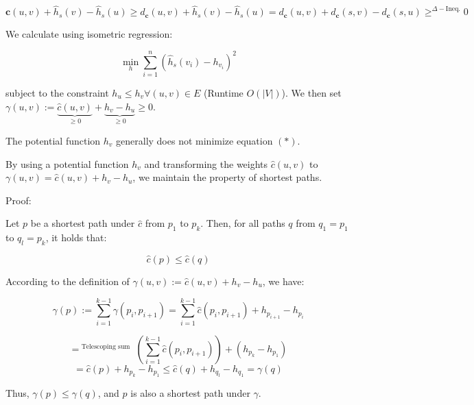 \documentclass[11pt]{scrartcl}
\begin{document}
$$\mathbf{c}(u,v)+\hat{h}_s(v)-\hat{h}_s(u) \ge d_{\mathbf{c}}(u,v) + \hat{h}_s(v)-\hat{h}_s(u) = d_{\mathbf{c}}(u,v)+d_{\mathbf{c}}(s,v)-d_{\mathbf{c}}(s,u) \ge^{\Delta-\text{Ineq.}} 0$$

We calculate using isometric regression:

$$\min_{h} \sum_{i=1}^n(\hat{h}_s(v_i)-h_{v_i})^2$$

subject to the constraint $h_u \le h_v \forall (u,v) \in E$ (Runtime $O(|V|)$).
We then set $\gamma(u,v):=\underbrace{\hat{c}(u,v)}_{\ge 0} + \underbrace{h_v-h_u}_{\ge 0} \ge 0$.

The potential function $h_v$ generally does not minimize equation $(*)$.

By using a potential function $h_v$ and transforming the weights $\hat{c}(u,v)$ to $\gamma(u,v) = \hat{c}(u,v)+h_v-h_u$, we maintain the property of shortest paths. 

Proof: 

Let $p$ be a shortest path under $\hat{c}$ from $p_1$ to $p_k$. Then, for all paths $q$ from $q_1 = p_1$ to $q_l = p_k$, it holds that:

$$\hat{c}(p) \le \hat{c}(q) $$

According to the definition of $\gamma(u,v):= \hat{c}(u,v) + h_v-h_u$, we have:

$$\gamma(p) := \sum_{i=1}^{k-1} \gamma(p_i,p_{i+1}) = \sum_{i=1}^{k-1} \hat{c}(p_i,p_{i+1})+h_{p_{i+1}}-h_{p_{i}} $$

$$=^\text{ Telescoping sum } (\sum_{i=1}^{k-1} \hat{c}(p_i,p_{i+1}))+(h_{p_k}-h_{p_1})$$
$$ = \hat{c}(p)+h_{p_k}-h_{p_1} \le \hat{c}(q)+h_{q_l}-h_{q_1} = \gamma(q)$$

Thus, $\gamma(p) \le \gamma(q)$, and $p$ is also a shortest path under $\gamma$.
\end{document}
